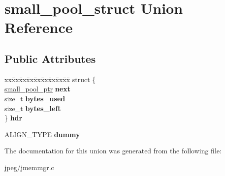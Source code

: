 \hypertarget{unionsmall__pool__struct}{}\section{small\+\_\+pool\+\_\+struct Union Reference}
\label{unionsmall__pool__struct}
\subsection*{Public Attributes}
\begin{DoxyCompactItemize}
\item 
\begin{tabbing}
xx\=xx\=xx\=xx\=xx\=xx\=xx\=xx\=xx\=\kill
struct \{\\
\>\hyperlink{unionsmall__pool__struct}{small\_pool\_ptr} {\bfseries next}\\
\>size\_t {\bfseries bytes\_used}\\
\>size\_t {\bfseries bytes\_left}\\
\} {\bfseries hdr}\hypertarget{unionsmall__pool__struct_a57b0280cce2d70f030f2174dc208739d}{}\label{unionsmall__pool__struct_a57b0280cce2d70f030f2174dc208739d}
\\

\end{tabbing}\item 
A\+L\+I\+G\+N\+\_\+\+T\+Y\+PE {\bfseries dummy}\hypertarget{unionsmall__pool__struct_a73cdd7a86eb8b88c7e4e9ff91aee3f99}{}\label{unionsmall__pool__struct_a73cdd7a86eb8b88c7e4e9ff91aee3f99}

\end{DoxyCompactItemize}


The documentation for this union was generated from the following file\+:\begin{DoxyCompactItemize}
\item 
jpeg/jmemmgr.\+c\end{DoxyCompactItemize}
